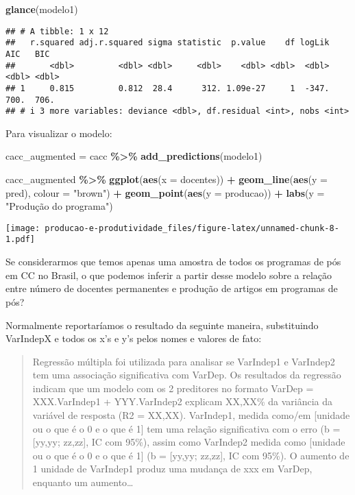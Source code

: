 \documentclass[
]{article}
\newenvironment{Shaded}{\begin{snugshade}}{\end{snugshade}}
\newcommand{\AttributeTok}[1]{\textcolor[rgb]{0.13,0.29,0.53}{#1}}
\newcommand{\FunctionTok}[1]{\textcolor[rgb]{0.13,0.29,0.53}{\textbf{#1}}}
\newcommand{\NormalTok}[1]{#1}
\newcommand{\OtherTok}[1]{\textcolor[rgb]{0.56,0.35,0.01}{#1}}
\newcommand{\SpecialCharTok}[1]{\textcolor[rgb]{0.81,0.36,0.00}{\textbf{#1}}}
\newcommand{\StringTok}[1]{\textcolor[rgb]{0.31,0.60,0.02}{#1}}
\begin{document}
\begin{Shaded}
\begin{Highlighting}[]
\FunctionTok{glance}\NormalTok{(modelo1)}
\end{Highlighting}
\end{Shaded}

\begin{verbatim}
## # A tibble: 1 x 12
##   r.squared adj.r.squared sigma statistic  p.value    df logLik   AIC   BIC
##       <dbl>         <dbl> <dbl>     <dbl>    <dbl> <dbl>  <dbl> <dbl> <dbl>
## 1     0.815         0.812  28.4      312. 1.09e-27     1  -347.  700.  706.
## # i 3 more variables: deviance <dbl>, df.residual <int>, nobs <int>
\end{verbatim}

Para visualizar o modelo:

\begin{Shaded}
\begin{Highlighting}[]
\NormalTok{cacc\_augmented }\OtherTok{=}\NormalTok{ cacc }\SpecialCharTok{\%\textgreater{}\%} 
  \FunctionTok{add\_predictions}\NormalTok{(modelo1) }

\NormalTok{cacc\_augmented }\SpecialCharTok{\%\textgreater{}\%} 
  \FunctionTok{ggplot}\NormalTok{(}\FunctionTok{aes}\NormalTok{(}\AttributeTok{x =}\NormalTok{ docentes)) }\SpecialCharTok{+} 
  \FunctionTok{geom\_line}\NormalTok{(}\FunctionTok{aes}\NormalTok{(}\AttributeTok{y =}\NormalTok{ pred), }\AttributeTok{colour =} \StringTok{"brown"}\NormalTok{) }\SpecialCharTok{+} 
  \FunctionTok{geom\_point}\NormalTok{(}\FunctionTok{aes}\NormalTok{(}\AttributeTok{y =}\NormalTok{ producao)) }\SpecialCharTok{+} 
  \FunctionTok{labs}\NormalTok{(}\AttributeTok{y =} \StringTok{"Produção do programa"}\NormalTok{)}
\end{Highlighting}
\end{Shaded}

\texttt{[image: producao-e-produtividade\_files/figure-latex/unnamed-chunk-8-1.pdf]}

Se considerarmos que temos apenas uma amostra de todos os programas de
pós em CC no Brasil, o que podemos inferir a partir desse modelo sobre a
relação entre número de docentes permanentes e produção de artigos em
programas de pós?

Normalmente reportaríamos o resultado da seguinte maneira, substituindo
VarIndepX e todos os x's e y's pelos nomes e valores de fato:

\begin{quote}
Regressão múltipla foi utilizada para analisar se VarIndep1 e VarIndep2
tem uma associação significativa com VarDep. Os resultados da regressão
indicam que um modelo com os 2 preditores no formato VarDep =
XXX.VarIndep1 + YYY.VarIndep2 explicam XX,XX\% da variância da variável
de resposta (R2 = XX,XX). VarIndep1, medida como/em {[}unidade ou o que
é o 0 e o que é 1{]} tem uma relação significativa com o erro (b =
{[}yy,yy; zz,zz{]}, IC com 95\%), assim como VarIndep2 medida como
{[}unidade ou o que é o 0 e o que é 1{]} (b = {[}yy,yy; zz,zz{]}, IC com
95\%). O aumento de 1 unidade de VarIndep1 produz uma mudança de xxx em
VarDep, enquanto um aumento\ldots{}
\end{quote}
\end{document}
